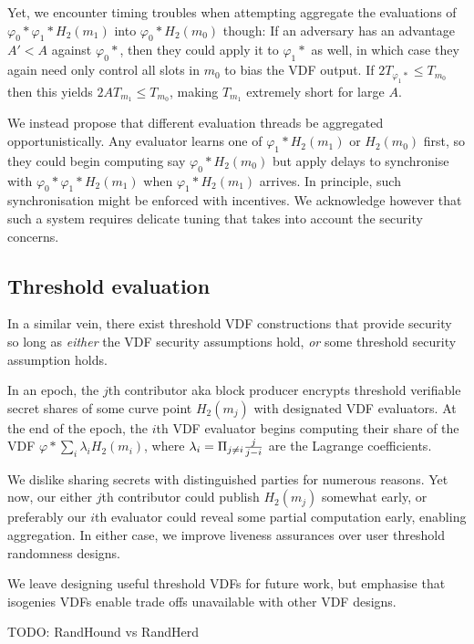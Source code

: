 \documentclass{article}
\begin{document}
Yet, we encounter timing troubles when attempting aggregate the
evaluations of $φ_0* φ_1* H_2(m_1)$ into $φ_0* H_2(m_0)$ though:  
If an adversary has an advantage $A' < A$ against $φ_0*$, then they
could apply it to $φ_1*$ as well, in which case they again need only
control all slots in $m_0$ to bias the VDF output.  
If $2 T_{φ_1*} \leq T_{m_0}$ then this yields $2 A T_{m_1} \leq T_{m_0}$,
making $T_{m_1}$ extremely short for large $A$.  

We instead propose that different evaluation threads be aggregated
opportunistically.  Any evaluator learns one of $φ_1* H_2(m_1)$ or
$H_2(m_0)$ first, so they could begin computing say $φ_0* H_2(m_0)$
but apply delays to synchronise with $φ_0* φ_1* H_2(m_1)$ when 
$φ_1* H_2(m_1)$ arrives.  In principle, such synchronisation might
be enforced with incentives.  We acknowledge however that such a
system requires delicate tuning that takes into account the
security concerns.  

\subsection{Threshold evaluation}

In a similar vein, there exist threshold VDF constructions that
provide security so long as {\it either} the VDF security assumptions
hold, {\it or} some threshold security assumption holds. 

In an epoch, the $j$th contributor aka block producer encrypts
threshold verifiable secret shares \cite{Schoenmakers99asimple} %
of some curve point $H_2(m_j)$ with designated VDF evaluators.
At the end of the epoch, the $i$th VDF evaluator begins computing
their share of the VDF  $φ* \sum_i \lambda_i H_2(m_i)$, where
$\lambda_i = \Pi_{j \neq i} {j \over j-i}$ are the Lagrange coefficients.

We dislike sharing secrets with distinguished parties for numerous
reasons.  Yet now, our either $j$th contributor could publish $H_2(m_j)$
somewhat early, or preferably our $i$th evaluator could reveal some
partial computation early, enabling aggregation.  In either case,
we improve liveness assurances over user threshold randomness designs.

We leave designing useful threshold VDFs for future work, but emphasise
that isogenies VDFs enable trade offs unavailable with other VDF designs. 

TODO: RandHound vs RandHerd



\end{document}
